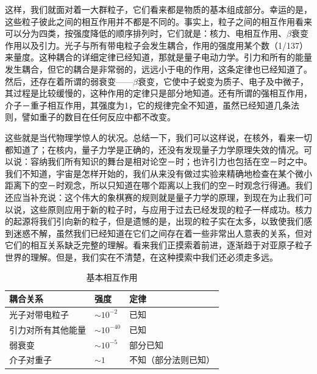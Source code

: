 这样，我们就面对着一大群粒子，它们看来都是物质的基本组成部分。幸运的是，这些粒子彼此之间的相互作用并不都是不同的。事实上，粒子之间的相互作用看来可以分为四类，按强度降低的顺序排列时，它们就是：核力、电相互作用、$\beta$衰变作用以及引力。光子与所有带电粒子会发生耦合，作用的强度用某个数（1/137）来量度。这种耦合的详细定律已经知道，那就是量子电动力学。引力和所有的能量发生耦合，但它的耦合是非常弱的，远远小于电的作用，这条定律也已经知道了。然后，还存在着所谓的弱衰变——$\beta$衰变，它使中子蜕变为质子、电子及中微子，其过程是比较缓慢的，这种作用的定律只是部分地知道。还有所谓的强相互作用，介子－重子相互作用，其强度为1，它的规律完全不知道，虽然已经知道几条法则，譬如重子的数目在任何反应中都不改变。

这些就是当代物理学惊人的状况。总结一下，我们可以这样说，在核外，看来一切都知道了；在核内，量子力学是正确的，还没有发现量子力学原理失效的情况。可以说：容纳我们所有知识的舞台是相对论空－时；也许引力也包括在空－时之中。我们不知道，宇宙是怎样开始的，我们从来没有做过实验来精确地检查在某个微小距离下的空－时观念，所以只知道在哪个距离以上我们的空－时观念行得通。我们还应当补充说：这个伟大的象棋赛的规则就是量子力学的原理，到现在为止我们可以说，这些原则应用于新的粒子时，与应用于过去已经发现的粒子一样成功。核力的起源将我们引向新的粒子，但是遗憾的是，出现的粒子实在太多，以致使我们感到迷惑不解，虽然我们已经知道在它们之间存在着一些非常出人意表的关系，但对它们的相互关系缺乏完整的理解。看来我们正摸索着前进，逐渐趋于对亚原子粒子世界的理解。但是，我们实在不清楚，在这种摸索中我们还必须走多远。

\begin{table}[H]
    \centering
    \label{tab:基本相互作用}
    \caption{基本相互作用}
    \medskip 
    \begin{tabular}{@{}lll@{}}
        \toprule
        耦合关系      & 强度             & 定律         \\ \midrule
        光子对带电粒子   & $\sim10^{-2}$  & 已知         \\
        引力对所有其他能量 & $\sim10^{-40}$ & 已知         \\
        弱衰变       & $\sim10^{-5}$  & 部分已知       \\
        介子对重子     & $\sim1$        & 不知（部分法则已知） \\ \bottomrule
    \end{tabular}
\end{table}